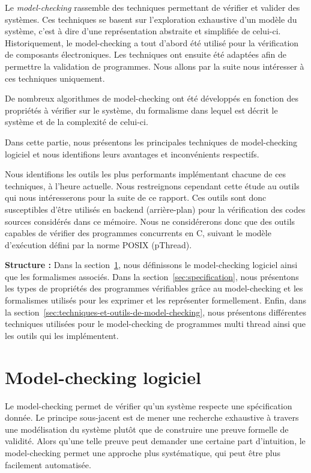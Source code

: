 \label{sec:RevLitt}

Le \emph{model-checking} rassemble des techniques permettant de vérifier
et valider des systèmes. Ces techniques se basent sur l'exploration
exhaustive d'un modèle du système, c'est à dire d'une représentation
abstraite et simplifiée de celui-ci. Historiquement, le model-checking a
tout d'abord été utilisé pour la vérification de composants
électroniques. Les techniques ont ensuite été adaptées afin de permettre
la validation de programmes. Nous allons par la suite nous intéresser à
ces techniques uniquement.

De nombreux algorithmes de model-checking ont été développés en fonction
des propriétés à vérifier sur le système, du formalisme dans lequel est
décrit le système et de la complexité de celui-ci.

Dans cette partie, nous présentons les principales techniques de
model-checking logiciel et nous identifions leurs avantages et
inconvénients respectifs.

Nous identifions les outils les plus performants implémentant chacune de ces
techniques, à l'heure actuelle. Nous restreignons cependant cette étude au
outils qui nous intéresserons pour la suite de ce rapport. Ces outils sont donc
susceptibles d'être utilisés en backend (arrière-plan) pour la vérification des
codes sources considérés dans ce mémoire. Nous ne considérerons donc que
des outils capables de vérifier des programmes concurrents en C, suivant le
modèle d'exécution défini par la norme POSIX (pThread).

\textbf{Structure :} Dans la section~\ref{sec:model-checking-logiciel}, nous
définissons le model-checking logiciel ainsi que les formalismes associés.
Dans la section~\ref{sec:specification}, nous présentons
les types de propriétés des programmes vérifiables grâce au model-checking et
les formalismes utilisés pour les exprimer et les représenter formellement.
Enfin, dans la section~\ref{sec:techniques-et-outils-de-model-checking}, nous
présentons différentes techniques utilisées pour le model-checking de programmes
multi thread ainsi que les outils qui les implémentent.

\section{Model-checking logiciel}\label{sec:model-checking-logiciel}

Le model-checking permet de vérifier qu'un système respecte une
spécification donnée. Le principe sous-jacent est de mener une recherche
exhaustive à travers une modélisation du système plutôt que de
construire une preuve formelle de validité. Alors qu'une telle preuve
peut demander une certaine part d'intuition, le model-checking permet
une approche plus systématique, qui peut être plus facilement
automatisée.

